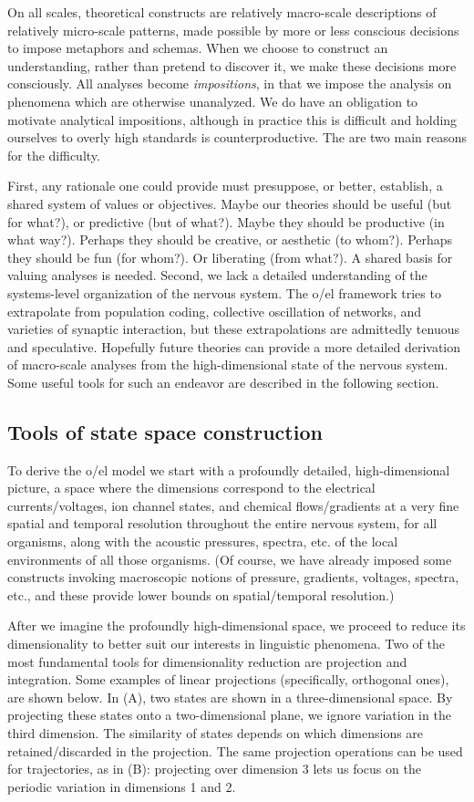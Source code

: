  On all scales, theoretical constructs are relatively macro-scale descriptions of relatively micro-scale patterns, made possible by more or less conscious decisions to impose metaphors and schemas. When we choose to construct an understanding, rather than pretend to discover it, we make these decisions more consciously. All analyses become \textit{impositions}, in that we impose the analysis on phenomena which are otherwise unanalyzed. We do have an obligation to motivate analytical impositions, although in practice this is difficult and holding ourselves to overly high standards is counterproductive. The are two main reasons for the difficulty. 

  First, any rationale one could provide must presuppose, or better, establish, a shared system of values or objectives. Maybe our theories should be useful (but for what?), or predictive (but of what?). Maybe they should be productive (in what way?). Perhaps they should be creative, or aesthetic (to whom?). Perhaps they should be fun (for whom?). Or liberating (from what?). A shared basis for valuing analyses is needed. Second, we lack a detailed understanding of the systems-level organization of the nervous system. The o/el framework tries to extrapolate from population coding, collective oscillation of networks, and varieties of synaptic interaction, but these extrapolations are admittedly tenuous and speculative. Hopefully future theories can provide a more detailed derivation of macro-scale analyses from the high-dimensional state of the nervous system. Some useful tools for such an endeavor are described in the following section.

\subsection{Tools of state space construction}

To derive the o/el model we start with a profoundly detailed, high-dimensional picture, a space where the dimensions correspond to the electrical currents/voltages, ion channel states, and chemical flows/gradients at a very fine spatial and temporal resolution throughout the entire nervous system, for all organisms, along with the acoustic pressures, spectra, etc. of the local environments of all those organisms. (Of course, we have already imposed some constructs invoking macroscopic notions of pressure, gradients, voltages, spectra, etc., and these provide lower bounds on spatial/temporal resolution.) 

  After we imagine the profoundly high-dimensional space, we proceed to reduce its dimensionality to better suit our interests in linguistic phenomena. Two of the most fundamental tools for dimensionality reduction are projection and integration. Some examples of linear projections (specifically, orthogonal ones), are shown below. In (A), two states are shown in a three-dimensional space. By projecting these states onto a two-dimensional plane, we ignore variation in the third dimension. The similarity of states depends on which dimensions are retained/discarded in the projection. The same projection operations can be used for trajectories, as in (B): projecting over dimension 3 lets us focus on the periodic variation in dimensions 1 and 2.

